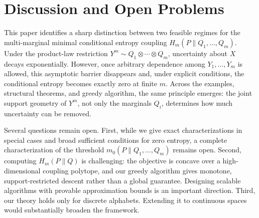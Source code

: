 \documentclass[journal]{IEEEtran}
\newcommand{\1}{\mathbf{1}}
\begin{document}
\section{Discussion and Open Problems}
\label{sec:discussion}
This paper identifies a sharp distinction between two feasible regimes for the multi-marginal minimal conditional entropy coupling \(H_m(P\|Q_1,\ldots,Q_m)\). Under the product-law
restriction \(Y^m\sim Q_1\otimes\cdots\otimes Q_m\), uncertainty about \(X\)
decays exponentially. However, once arbitrary dependence among \(Y_1,\ldots,Y_m\) is allowed, this asymptotic
barrier disappears and, under explicit conditions, the conditional entropy becomes exactly zero at finite \(m\). 
Across the examples, structural
theorems, and greedy algorithm, the same principle emerges: the joint support
geometry of \(Y^m\), not only the marginals \(Q_i\), determines
how much uncertainty can be removed.

Several questions remain open. First, while we give exact characterizations in
special cases and broad sufficient conditions for zero entropy, a complete
characterization of the threshold \(m_0(P\|Q_1,\ldots,Q_m)\) remains open.
Second, computing \(H_m(P\|Q)\) is challenging: the objective is concave over a
high-dimensional coupling polytope, and our greedy algorithm gives monotone,
support-restricted descent rather than a global guarantee. Designing scalable
algorithms with provable approximation bounds is an important direction.  Third, our theory holds only for discrete alphabets. Extending it to continuous spaces would substantially broaden the framework.
\end{document}
